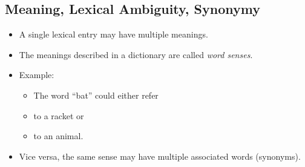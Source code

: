 \documentclass[a4paper, 11pt, accentcolor = tud3b]{tudreport}
\begin{document}
            \subsection{Meaning, Lexical Ambiguity, Synonymy} %
                \begin{itemize}
                   	\item A single lexical entry may have multiple meanings.
                   	\item The meanings described in a dictionary are called \textit{word senses}.
                   	\item Example:
                   		\begin{itemize}
                   			\item The word \enquote{bat} could either refer
                   			\item to a racket or
                   			\item to an animal.
                   		\end{itemize}
                   	\item Vice versa, the same sense may have multiple associated words (synonyms).
                \end{itemize}
\end{document}
